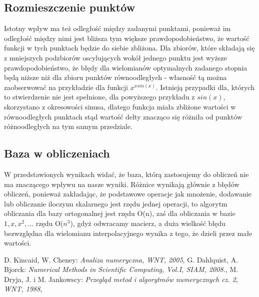 \documentclass{article}
\begin{document}
\subsection{Rozmieszczenie punktów}
Istotny wpływ ma też odległość między zadanymi punktami, ponieważ im odległość między nimi jest bliższa tym większe prawdopodobieństwo, że wartość funkcji w tych punktach będzie do siebie zbliżona. Dla zbiorów, które składają się z mniejszych podzbiorów oscylujących wokół jednego punktu jest wyższe prawdopodobieństwo, że błędy dla wielomianów optymalnych zadanego stopnia będą niższe niż dla zbioru punktów równoodległych - własność tą można zaobserwować na przykładzie dla funkcji $x ^{x sin(x)}$.
Istnieją przypadki dla, których to stwierdzenie nie jest spełnione, dla powyższego przykładu z $sin(x)$, skorzystano z okresowości sinusa, dlatego funkcja miała zbliżone wartości w równoodległych punktach stąd wartość delty znacząco się różniła od punktów różnoodległych na tym samym przedziale.

\subsection{Baza w obliczeniach}
W przedstawionych wynikach widać, że baza, którą zastosujemy do obliczeń nie ma znaczącego wpływu na nasze wyniki. Różnice wynikają głównie z błędów obliczeń, ponieważ zakładając, że podstawowe operacje jak mnożenie, dodawanie lub obliczanie iloczynu skalarnego jest rzędu jednej operacji, to algorytm obliczania dla bazy ortogonalnej jest rzędu O(n), zaś dla obliczania w bazie {$1, x, x^{2}, ...$} rzędu O($n^{3}$), gdyż odwracamy macierz, a duża wielkość błędu bezwzględna dla wielomianu interpolacyjnego wynika z tego, że dzieli przez małe wartości.

\begin{thebibliography}{99}
\bibitem{} D. Kincaid, W. Cheney:
\emph{Analiza numeryczna, WNT, 2005},
\bibitem{} G. Dahlquist, A. Bjorck:
\emph{Numerical Methods in Scientific Computing, Vol.I, SIAM, 2008.},
\bibitem{} M. Dryja, J. i M. Jankowscy:
\emph{Przegląd metod i algorytmów numerycznych cz. 2, WNT, 1988},

\end{thebibliography}
\end{document}
